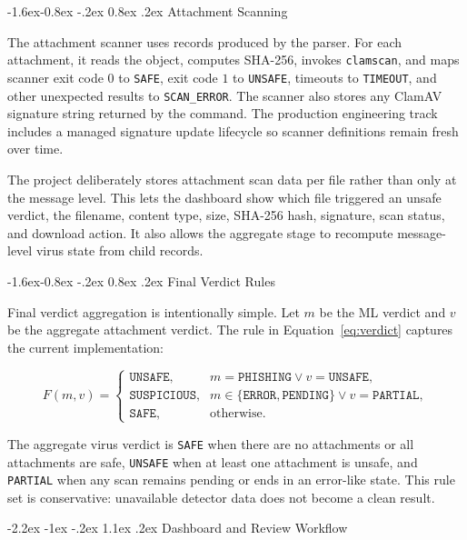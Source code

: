 \documentclass[12pt,a4paper]{article}
\makeatletter
\renewcommand\section{\@startsection {section}{1}{\z@}%
  {-2.2ex \@plus -1ex \@minus -.2ex}%
  {1.1ex \@plus .2ex}%
  {\centering\normalfont\normalsize\bfseries}}
\renewcommand\subsection{\@startsection{subsection}{2}{\z@}%
  {-1.6ex\@plus -0.8ex \@minus -.2ex}%
  {0.8ex \@plus .2ex}%
  {\normalfont\normalsize\bfseries}}
\makeatother
\begin{document}
\subsection{Attachment Scanning}

The attachment scanner uses records produced by the parser. For each attachment, it reads the object, computes SHA-256, invokes \texttt{clamscan}, and maps scanner exit code \(0\) to \texttt{SAFE}, exit code \(1\) to \texttt{UNSAFE}, timeouts to \texttt{TIMEOUT}, and other unexpected results to \texttt{SCAN\_ERROR}. The scanner also stores any ClamAV signature string returned by the command. The production engineering track includes a managed signature update lifecycle so scanner definitions remain fresh over time.

The project deliberately stores attachment scan data per file rather than only at the message level. This lets the dashboard show which file triggered an unsafe verdict, the filename, content type, size, SHA-256 hash, signature, scan status, and download action. It also allows the aggregate stage to recompute message-level virus state from child records.

\subsection{Final Verdict Rules}

Final verdict aggregation is intentionally simple. Let \(m\) be the ML verdict and \(v\) be the aggregate attachment verdict. The rule in Equation~\ref{eq:verdict} captures the current implementation:

\begin{equation}
F(m,v)=
\begin{cases}
\texttt{UNSAFE}, & m=\texttt{PHISHING} \lor v=\texttt{UNSAFE},\\
\texttt{SUSPICIOUS}, & m\in\{\texttt{ERROR},\texttt{PENDING}\} \lor v=\texttt{PARTIAL},\\
\texttt{SAFE}, & \text{otherwise.}
\end{cases}
\label{eq:verdict}
\end{equation}

The aggregate virus verdict is \texttt{SAFE} when there are no attachments or all attachments are safe, \texttt{UNSAFE} when at least one attachment is unsafe, and \texttt{PARTIAL} when any scan remains pending or ends in an error-like state. This rule set is conservative: unavailable detector data does not become a clean result.

\section{Dashboard and Review Workflow}
\end{document}
